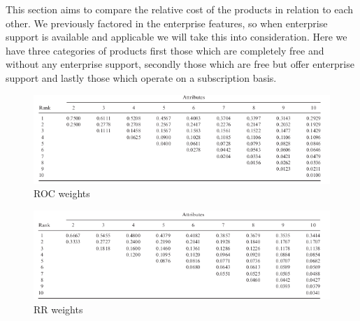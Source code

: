 



This section aims to compare the relative cost of the products in relation to each other.
We previously factored in the enterprise features, so when enterprise support is available and applicable we will take this into consideration.
Here we have three categories of products first those which are completely free and without any enterprise support, secondly those which are free but offer enterprise support and lastly those which operate on a subscription basis.




\newpage
{}


\begin{figure}[htb]
  \centering
  \includegraphics[width=16cm]{graphics/ROC_weights.png}
  \caption[ROC weights]{ROC weights \footnotemark}
  \label{abb:Roc_weights}
\end{figure}


\begin{figure}[htb]
    \centering
    \includegraphics[width=16cm]{graphics/RR_weigths.png}
    \caption[RR weights]{RR weights \footnotemark}
    \label{abb:RR_weights}
  \end{figure}
  
